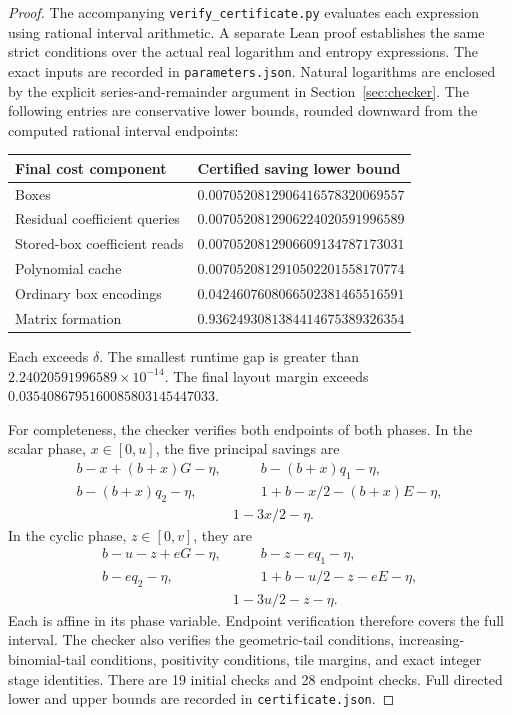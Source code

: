 \documentclass[11pt,a4paper]{article}
\begin{document}
\begin{proof}
The accompanying \texttt{verify\_certificate.py} evaluates each expression
using rational interval arithmetic. A separate Lean proof establishes the
same strict conditions over the actual real logarithm and entropy
expressions. The exact inputs are recorded in
\texttt{parameters.json}. Natural logarithms are enclosed by the
explicit series-and-remainder argument in Section~\ref{sec:checker}.
The following entries are conservative lower bounds, rounded downward
from the computed rational interval endpoints:
\begin{center}
\begin{tabular}{@{}ll@{}}
\toprule
Final cost component & Certified saving lower bound\\
\midrule
Boxes & $0.0070520812906416578320069557$\\
Residual coefficient queries & $0.0070520812906224020591996589$\\
Stored-box coefficient reads & $0.0070520812906609134787173031$\\
Polynomial cache & $0.0070520812910502201558170774$\\
Ordinary box encodings & $0.0424607608066502381465516591$\\
Matrix formation & $0.9362493081384414675389326354$\\
\bottomrule
\end{tabular}
\end{center}
Each exceeds $\delta$. The smallest runtime gap is greater than
$2.24020591996589\times10^{-14}$. The final layout margin exceeds
$0.0354086795160085803145447033$.

For completeness, the checker verifies both endpoints of both phases.
In the scalar phase, $x\in[0,u]$, the five principal savings are
\begin{align*}
 b-x+(b+x)G-\eta,&\qquad b-(b+x)q_1-\eta,\\
 b-(b+x)q_2-\eta,&\qquad 1+b-x/2-(b+x)E-\eta,\\
 &1-3x/2-\eta.
\end{align*}
In the cyclic phase, $z\in[0,v]$, they are
\begin{align*}
 b-u-z+eG-\eta,&\qquad b-z-eq_1-\eta,\\
 b-eq_2-\eta,&\qquad 1+b-u/2-z-eE-\eta,\\
 &1-3u/2-z-\eta.
\end{align*}
Each is affine in its phase variable. Endpoint verification therefore
covers the full interval. The checker also verifies the geometric-tail
conditions, increasing-binomial-tail conditions, positivity conditions,
tile margins, and exact integer stage identities. There are 19 initial
checks and 28 endpoint checks. Full directed lower and upper bounds are
recorded in \texttt{certificate.json}.
\end{proof}
\end{document}

